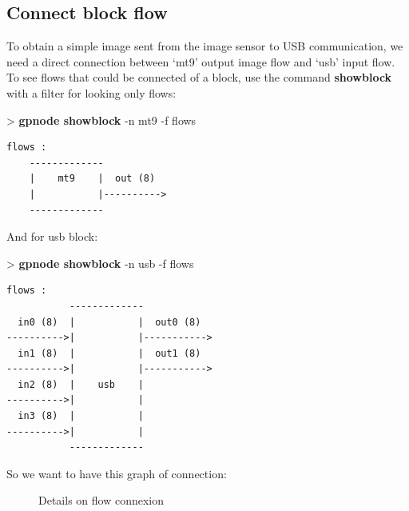\documentclass[10pt,a4paper]{article}
\begin{document}
\subsection{Connect block flow}
To obtain a simple image sent from the image sensor to USB communication, we need a direct connection between `mt9' output image flow and `usb' input flow. To see flows that could be connected of a block, use the command \textbf{showblock} with a filter for looking only flows:

\begin{sample}
> \textbf{gpnode showblock} -n mt9 -f flows
\begin{Verbatim}
flows :
    -------------       
    |    mt9    |  out (8) 
    |           |---------->
    -------------
\end{Verbatim}
\end{sample}

And for usb block:

\begin{sample}
> \textbf{gpnode showblock} -n usb -f flows
\begin{Verbatim}
flows :
           -------------        
  in0 (8)  |           |  out0 (8)  
---------->|           |----------->
  in1 (8)  |           |  out1 (8)  
---------->|           |----------->
  in2 (8)  |    usb    |        
---------->|           |        
  in3 (8)  |           |        
---------->|           |        
           -------------
\end{Verbatim}
\end{sample}

So we want to have this graph of connection:
\begin{figure}[h!]
\centering
{}
\caption{Details on flow connexion}
\end{figure}
\end{document}
